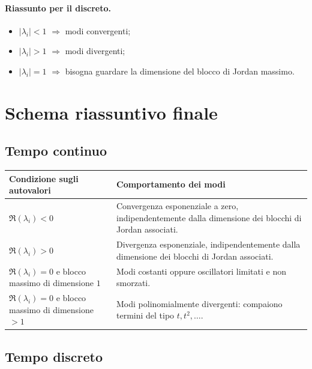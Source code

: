 \paragraph{Riassunto per il discreto.}
\begin{itemize}
    \item $|\lambda_i|<1$ $\Rightarrow$ modi convergenti;
    \item $|\lambda_i|>1$ $\Rightarrow$ modi divergenti;
    \item $|\lambda_i|=1$ $\Rightarrow$ bisogna guardare la dimensione del blocco di Jordan massimo.
\end{itemize}

\section{Schema riassuntivo finale}

\subsection*{Tempo continuo}

\begin{center}
\renewcommand{\arraystretch}{1.4}
\begin{tabular}{>{\raggedright\arraybackslash}p{4.2cm} >{\raggedright\arraybackslash}p{9.5cm}}
\toprule
Condizione sugli autovalori & Comportamento dei modi \\
\midrule
$\Re(\lambda_i)<0$ &
Convergenza esponenziale a zero, indipendentemente dalla dimensione dei blocchi di Jordan associati. \\
\addlinespace
$\Re(\lambda_i)>0$ &
Divergenza esponenziale, indipendentemente dalla dimensione dei blocchi di Jordan associati. \\
\addlinespace
$\Re(\lambda_i)=0$ e blocco massimo di dimensione $1$ &
Modi costanti oppure oscillatori limitati e non smorzati. \\
\addlinespace
$\Re(\lambda_i)=0$ e blocco massimo di dimensione $>1$ &
Modi polinomialmente divergenti: compaiono termini del tipo $t, t^2, \dots$. \\
\bottomrule
\end{tabular}
\end{center}

\subsection*{Tempo discreto}

